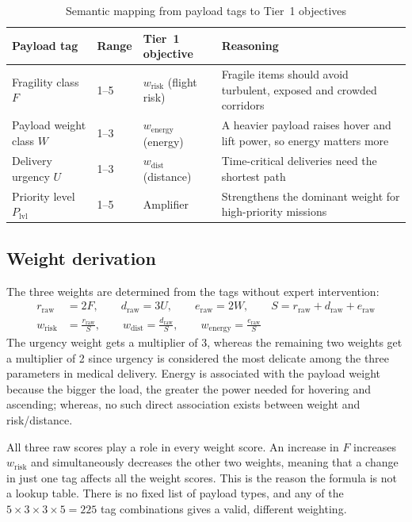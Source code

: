 \begin{table}[!htbp]
\centering
\caption{Semantic mapping from payload tags to Tier~1 objectives}\label{tab:semantic-mapping}
\small
\begin{tabular}{|P{3.0cm}|P{1.2cm}|P{3.6cm}|P{6.2cm}|}
\hline
\textbf{Payload tag} & \textbf{Range} & \textbf{Tier~1 objective} & \textbf{Reasoning}\\
\hline
Fragility class $F$ & 1--5 & $w_\mathrm{risk}$ (flight risk) & Fragile items should avoid turbulent, exposed and crowded corridors\\
\hline
Payload weight class $W$ & 1--3 & $w_\mathrm{energy}$ (energy) & A heavier payload raises hover and lift power, so energy matters more\\
\hline
Delivery urgency $U$ & 1--3 & $w_\mathrm{dist}$ (distance) & Time-critical deliveries need the shortest path\\
\hline
Priority level $P_\mathrm{lvl}$ & 1--5 & Amplifier & Strengthens the dominant weight for high-priority missions\\
\hline
\end{tabular}
\end{table}

\subsection{Weight derivation}

The three weights are determined from the tags without expert intervention:
\begin{align}
  r_\mathrm{raw} &= 2F, \qquad d_\mathrm{raw} = 3U, \qquad e_\mathrm{raw} = 2W,
  \qquad S = r_\mathrm{raw} + d_\mathrm{raw} + e_\mathrm{raw} \label{eq:raw}\\
  w_\mathrm{risk} &= \frac{r_\mathrm{raw}}{S}, \qquad
  w_\mathrm{dist} = \frac{d_\mathrm{raw}}{S}, \qquad
  w_\mathrm{energy} = \frac{e_\mathrm{raw}}{S} \label{eq:weights}
\end{align}
The urgency weight gets a multiplier of 3, whereas the remaining two weights get a
multiplier of 2 since urgency is considered the most delicate among the three parameters
in medical delivery. Energy is associated with the payload weight because the bigger the
load, the greater the power needed for hovering and ascending; whereas, no such direct
association exists between weight and risk/distance.

All three raw scores play a role in every weight score. An increase in $F$ increases
$w_\mathrm{risk}$ and simultaneously decreases the other two weights, meaning that a
change in just one tag affects all the weight scores.
This is the reason the formula is not a lookup table. There is no fixed list of payload
types, and any of the $5 \times 3 \times 3 \times 5 = 225$ tag combinations gives a
valid, different weighting.

